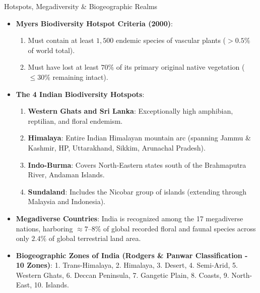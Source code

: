\begin{formulabox}{Hotspots, Megadiversity \& Biogeographic Realms}
\begin{itemize}[leftmargin=1.2em]
    \item \textbf{Myers Biodiversity Hotspot Criteria (2000)}:
    \begin{enumerate}
        \item Must contain at least $1{,}500$ endemic species of vascular plants ($>0.5\%$ of world total).
        \item Must have lost at least $70\%$ of its primary original native vegetation ($\le 30\%$ remaining intact).
    \end{enumerate}
    \item \textbf{The 4 Indian Biodiversity Hotspots}:
    \begin{enumerate}
        \item \textbf{Western Ghats and Sri Lanka}: Exceptionally high amphibian, reptilian, and floral endemism.
        \item \textbf{Himalaya}: Entire Indian Himalayan mountain arc (spanning Jammu \& Kashmir, HP, Uttarakhand, Sikkim, Arunachal Pradesh).
        \item \textbf{Indo-Burma}: Covers North-Eastern states south of the Brahmaputra River, Andaman Islands.
        \item \textbf{Sundaland}: Includes the Nicobar group of islands (extending through Malaysia and Indonesia).
    \end{enumerate}
    \item \textbf{Megadiverse Countries}: India is recognized among the 17 megadiverse nations, harboring $\approx 7\text{--}8\%$ of global recorded floral and faunal species across only $2.4\%$ of global terrestrial land area.
    \item \textbf{Biogeographic Zones of India (Rodgers \& Panwar Classification - 10 Zones)}:
    1. Trans-Himalaya, 2. Himalaya, 3. Desert, 4. Semi-Arid, 5. Western Ghats, 6. Deccan Peninsula, 7. Gangetic Plain, 8. Coasts, 9. North-East, 10. Islands.
\end{itemize}
\end{formulabox}

